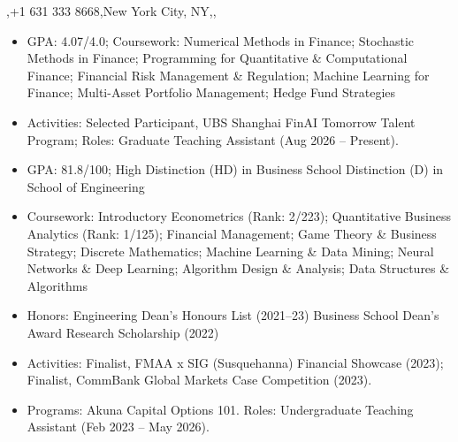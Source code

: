 \documentclass{article}
\begin{document}
  {\sep +1 631 333 8668\sep New York City, NY\sep \linkedin\sep \github}
\cvheaderend

\begin{itemize}
  \item GPA: 4.07/4.0; Coursework: Numerical Methods in Finance; Stochastic Methods in Finance; Programming for Quantitative \& Computational Finance; Financial Risk Management \& Regulation; Machine Learning for Finance; Multi-Asset Portfolio Management; Hedge Fund Strategies
  \item Activities: Selected Participant, UBS Shanghai FinAI Tomorrow Talent Program; Roles: Graduate Teaching Assistant (Aug 2026 -- Present).
\end{itemize}
\entrygap
{}
\begin{itemize}
  \item GPA: 81.8/100; High Distinction (HD) in Business School \textbar{} Distinction (D) in School of Engineering
  \item Coursework: Introductory Econometrics (Rank: 2/223); Quantitative Business Analytics (Rank: 1/125); Financial Management; Game Theory \& Business Strategy; Discrete Mathematics; Machine Learning \& Data Mining; Neural Networks \& Deep Learning; Algorithm Design \& Analysis; Data Structures \& Algorithms
  \item Honors: Engineering Dean's Honours List (2021--23) \textbar{} Business School Dean's Award \textbar{} Research Scholarship (2022)
  \item Activities: Finalist, FMAA x SIG (Susquehanna) Financial Showcase (2023); Finalist, CommBank Global Markets Case Competition (2023).
  \item Programs: Akuna Capital Options 101. Roles: Undergraduate Teaching Assistant (Feb 2023 -- May 2026).
\end{itemize}
\end{document}
